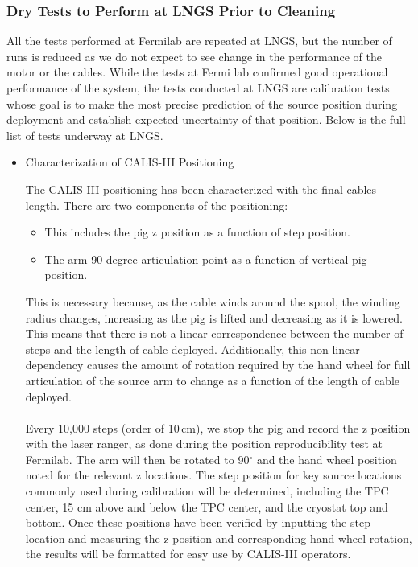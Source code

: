 \subsubsection{Dry Tests to Perform at LNGS Prior to Cleaning}
All the tests performed at Fermilab are  repeated at LNGS, but the number of runs is reduced as we do not expect to see change in the performance of the motor or the cables. While the tests at Fermi lab confirmed good operational performance of the system, the tests conducted at LNGS are calibration tests whose goal is to make the most precise prediction of the source position during deployment and establish expected uncertainty of that position.  Below is the full list of tests underway at LNGS.

 \begin{itemize}
  \item{Characterization of CALIS-III Positioning} 
 
   The CALIS-III positioning has been characterized with the final cables length. There are two components of the positioning: 

\begin{itemize}
\item
This includes the pig z position as a function of step position.
\item 
The arm 90 degree articulation point as a function of vertical pig position.  
\end{itemize}
This is necessary because, as the cable winds around the spool, the winding radius changes, increasing as the pig is lifted and decreasing as it is lowered.  This means that there is not a linear correspondence between the number of steps and the length of cable deployed.  Additionally, this non-linear dependency causes the amount of rotation required by the hand wheel for full articulation of the source arm to change as a function of the length of cable deployed.     
 
  \paragraph{}
  Every 10,000 steps (order of 10\,cm), we stop the pig and record the z position with the laser ranger, as done during the position reproducibility test at Fermilab.  The arm will then be rotated to 90$^{\circ}$ and the hand wheel position noted for the relevant z locations. The step position for key source locations commonly used during calibration will be determined, including the TPC center, 15 cm above and below the TPC center, and the cryostat top and bottom.  Once these positions have been verified by inputting the step location and measuring the z position and corresponding hand wheel rotation, the results will be formatted for easy use by CALIS-III operators.   
  

\end{itemize}
